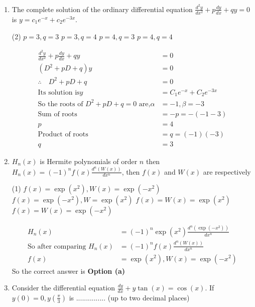 \begin{enumerate}[label=\color{ocre}\textbf{\arabic*.}]
\item The complete solution of the ordinary differential equation $\frac{d^{2} y}{d x^{2}}+p \frac{d y}{d x}+q y=0$ is $y=c_{1} e^{-x}+c_{2} e^{-3 x}$.
\begin{tasks}(2)
	\task[\textbf{a.}] $p=3, q=3 $
	\task[\textbf{b.}]$p=3, q=4 $
	\task[\textbf{c.}] $p=4, q=3 $
	\task[\textbf{d.}] $p=4, q=4 $
\end{tasks}
\begin{answer}
	$$
	\begin{aligned}
	\frac{d^{2} y}{d x^{2}}+p \frac{d y}{d x}+q y&=0\\
	\left(D^{2}+p D+q\right) y&=0\\
	\therefore \quad D^{2}+p D+q&=0\\
	\text{Its solution is}  y&=C_{1} e^{-x}+C_{2} e^{-3 x}\\
	\text{So the roots of $D^{2}+p D+q=0$ are,}   \alpha&=-1 , \beta=-3 \\
	\text{Sum of roots} &=-p=-(-1-3) \\p&=4 \\
	\text{Product of roots} &=q=(-1)(-3) \\ q&=3
	\end{aligned}$$
\end{answer}
\item $H_{n}(x)$ is Hermite polynomials of order $n$ then $H_{n}(x)=(-1)^{n} f(x) \frac{d^{n}(W(x))}{d x^{n}}$, then $f(x)$ and $W(x)$ are respectively
\begin{tasks}(1)
	\task[\textbf{a.}]$f(x)=\exp \left(x^{2}\right), W(x)=\exp \left(-x^{2}\right)$
	\task[\textbf{b.}]$f(x)=\exp \left(-x^{2}\right), W=\exp \left(x^{2}\right)$
	\task[\textbf{c.}] $f(x)=W(x)=\exp \left(x^{2}\right)$
	\task[\textbf{d.}] $f(x)=W(x)=\exp \left(-x^{2}\right)$
\end{tasks}
\begin{answer}
	$$\begin{aligned}
	H_{n}(x)&=(-1)^{n} \exp \left(x^{2}\right) \frac{d^{n}\left(\exp \left(-x^{2}\right)\right)}{d x^{n}}\\
	\text{So after comparing }H_{n}(x)&=(-1)^{n} f(x) \frac{d^{n}(W(x))}{d x^{n}}\\
	f(x)&=\exp \left(x^{2}\right), W(x)=\exp \left(-x^{2}\right)
	\end{aligned}$$
	So the correct answer is \textbf{Option (a)}
\end{answer}
\item Consider the differential equation $\frac{d y}{d x}+y \tan (x)=\cos (x)$. If $y(0)=0, y\left(\frac{\pi}{3}\right)$ is ............... (up to two decimal places)

\end{enumerate}
